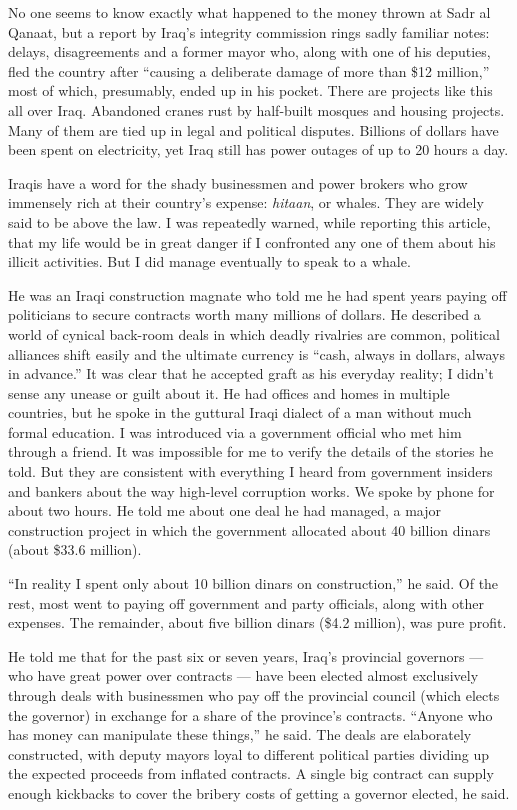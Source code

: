 No one seems to know exactly what happened to the money thrown at Sadr
al Qanaat, but a report by Iraq's integrity commission rings sadly
familiar notes: delays, disagreements and a former mayor who, along with
one of his deputies, fled the country after ``causing a deliberate
damage of more than \$12 million,'' most of which, presumably, ended up
in his pocket. There are projects like this all over Iraq. Abandoned
cranes rust by half-built mosques and housing projects. Many of them are
tied up in legal and political disputes. Billions of dollars have been
spent on electricity, yet Iraq still has power outages of up to 20 hours
a day.

Iraqis have a word for the shady businessmen and power brokers who grow
immensely rich at their country's expense: \emph{hitaan}, or whales.
They are widely said to be above the law. I was repeatedly warned, while
reporting this article, that my life would be in great danger if I
confronted any one of them about his illicit activities. But I did
manage eventually to speak to a whale.

He was an Iraqi construction magnate who told me he had spent years
paying off politicians to secure contracts worth many millions of
dollars. He described a world of cynical back-room deals in which deadly
rivalries are common, political alliances shift easily and the ultimate
currency is ``cash, always in dollars, always in advance.'' It was clear
that he accepted graft as his everyday reality; I didn't sense any
unease or guilt about it. He had offices and homes in multiple
countries, but he spoke in the guttural Iraqi dialect of a man without
much formal education. I was introduced via a government official who
met him through a friend. It was impossible for me to verify the details
of the stories he told. But they are consistent with everything I heard
from government insiders and bankers about the way high-level corruption
works. We spoke by phone for about two hours. He told me about one deal
he had managed, a major construction project in which the government
allocated about 40 billion dinars (about \$33.6 million).

``In reality I spent only about 10 billion dinars on construction,'' he
said. Of the rest, most went to paying off government and party
officials, along with other expenses. The remainder, about five billion
dinars (\$4.2 million), was pure profit.

He told me that for the past six or seven years, Iraq's provincial
governors --- who have great power over contracts --- have been elected
almost exclusively through deals with businessmen who pay off the
provincial council (which elects the governor) in exchange for a share
of the province's contracts. ``Anyone who has money can manipulate these
things,'' he said. The deals are elaborately constructed, with deputy
mayors loyal to different political parties dividing up the expected
proceeds from inflated contracts. A single big contract can supply
enough kickbacks to cover the bribery costs of getting a governor
elected, he said.

